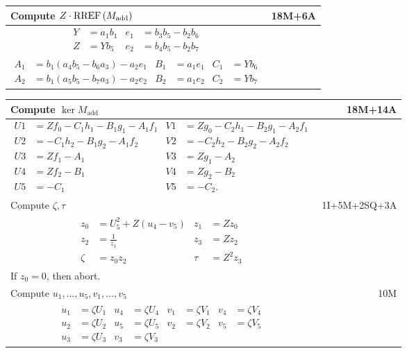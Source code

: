 \begin{tabularx}{\linewidth}{|Xr|}
  \hline
  Compute $Z \cdot \operatorname{RREF}\left(M_{\text{add}}\right)$ & 18M+6A \\
  \hline
  {\begin{align*}
    Y &= a_1b_1 & e_1 &= b_3b_5 - b_2b_6 \\
    Z &= Yb_5   & e_2 &= b_4b_5 - b_2b_7
  \end{align*}} & \\
  {\begin{align*}
    A_1 &= b_1(a_4b_5 - b_6a_3) - a_2e_1 & B_1 &= a_1e_1 & C_1 &= Yb_6 \\
    A_2 &= b_1(a_5b_5 - b_7a_3) - a_2e_2 & B_2 &= a_1e_2 & C_2 &= Yb_7
  \end{align*}} & \\
  \hline
\end{tabularx}

\pagebreak
\begin{tabularx}{\linewidth}{|Xr|}
  \hline
    Compute $\ker M_{\text{add}}$ & 18M+14A \\
  \hline
  {\begin{align*}
    U1 &= Zf_0 - C_1h_1 - B_1g_1 - A_1f_1 & V1 &= Zg_0 - C_2h_1 - B_2g_1 - A_2f_1 \\
    U2 &=      - C_1h_2 - B_1g_2 - A_1f_2 & V2 &=      - C_2h_2 - B_2g_2 - A_2f_2 \\
    U3 &= Zf_1 - A_1 & V3 &= Zg_1 - A_2 \\
    U4 &= Zf_2 - B_1 & V4 &= Zg_2 - B_2 \\
    U5 &=      - C_1 & V5 &=      - C_2.
  \end{align*}} & \\
  \hline
    Compute $\zeta, \tau$ & 1I+5M+2SQ+3A \\
  \hline
  {\begin{align*}
    z_0 &= U_5^2 + Z(u_4 - v_5) & z_1 &= Zz_0 \\
    z_2 &= \frac 1 {z_1} & z_3 &= Zz_2 \\
    \zeta &= z_0z_2 & \tau  &= Z^2z_3
  \end{align*}} & \\
  If $z_0 = 0$, then abort. & \\
  \hline
    Compute $u_1, \ldots, u_5, v_1, \ldots, v_5$ & 10M \\
  \hline
  {\begin{align*}
    u_1 &= \zeta U_1 & u_4 &= \zeta U_4 & v_1 &= \zeta V_1 & v_4 &= \zeta V_4 \\
    u_2 &= \zeta U_2 & u_5 &= \zeta U_5 & v_2 &= \zeta V_2 & v_5 &= \zeta V_5 \\
    u_3 &= \zeta U_3                    & v_3 &= \zeta V_3
  \end{align*}} & \\
  \hline
\end{tabularx}

